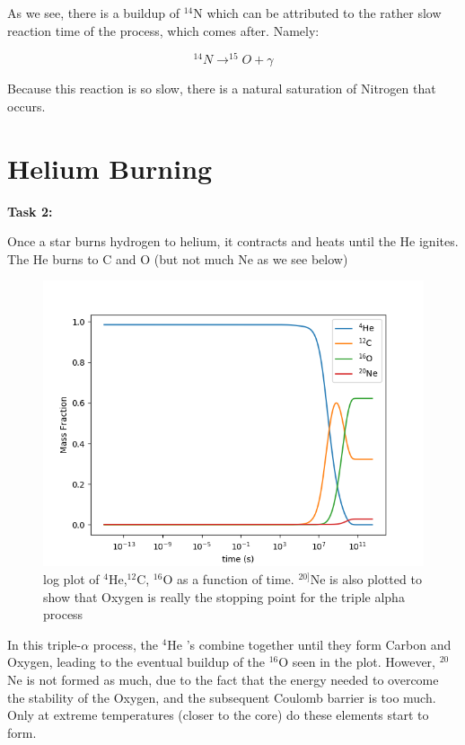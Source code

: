 \documentclass[manuscript]{aastex62}
\begin{document}
As we see, there is a buildup of $^{14}$N which can be attributed to the rather slow reaction time of the process, which comes after. Namely:

\begin{equation}
^{14}N \rightarrow ^{15}O + \gamma
\end{equation}

Because this reaction is so slow, there is a natural saturation of Nitrogen that occurs. 

\section{Helium Burning} \label{sec:He}


{\bf Task 2:}

Once a star burns hydrogen to helium, it contracts and heats until the He
ignites.  The He burns to C and O (but not much Ne as we see below)


\begin{figure}[h]
\includegraphics[scale=0.7]{task2}
\caption{log plot of $^4$He,$^{12}$C, $^{16}$O as a function of time. $^{20]}$Ne is also plotted to show that Oxygen is really the stopping point for the triple alpha process}
\end{figure}


In this triple-$\alpha$ process, the $^4$He 's combine together until they form Carbon and Oxygen, leading to the eventual buildup of the $^{16}$O seen in the plot. However, $^{20}$Ne is not formed as much, due to the fact that the energy needed to overcome the stability of the Oxygen, and the subsequent Coulomb barrier is too much. Only at extreme temperatures (closer to the core) do these elements start to form. 
\end{document}

